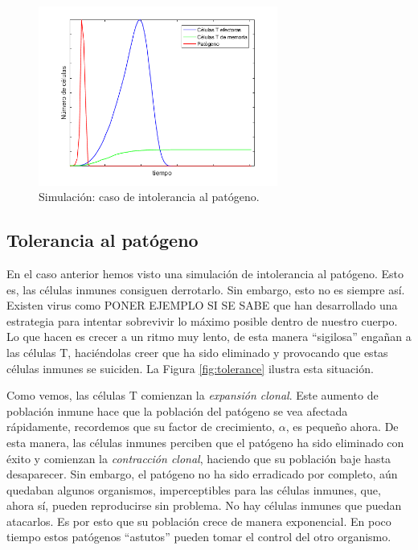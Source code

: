 \begin{figure}[t]
	\centering
	\includegraphics[width=0.7\textwidth]{Imagenes/Simulaciones/intolerance}
	\caption{Simulación: caso de intolerancia al patógeno.}
	\label{fig:intolerance}
\end{figure}

\subsection{Tolerancia al patógeno}

En el caso anterior hemos visto una simulación de intolerancia al patógeno. Esto es, las células inmunes consiguen derrotarlo. Sin embargo, esto no es siempre así. Existen virus como PONER EJEMPLO SI SE SABE que han desarrollado una estrategia para intentar sobrevivir lo máximo posible dentro de nuestro cuerpo. 
Lo que hacen es crecer a un ritmo muy lento, de esta manera ``sigilosa'' engañan a las células T, haciéndolas creer que ha sido eliminado y provocando que estas células inmunes se suiciden. La Figura \ref{fig:tolerance} ilustra esta situación.

Como vemos, las células T comienzan la \textit{expansión clonal}. Este aumento de población inmune hace que la población del patógeno se vea afectada rápidamente, recordemos que su factor de crecimiento, $\alpha$, es pequeño ahora. De esta manera, las células inmunes perciben que el patógeno ha sido eliminado con éxito y comienzan la \textit{contracción clonal}, haciendo que su población baje hasta desaparecer. Sin embargo, el patógeno no ha sido erradicado por completo, aún quedaban algunos organismos, imperceptibles para las células inmunes, que, ahora sí, pueden reproducirse sin problema. No hay células inmunes que puedan atacarlos. Es por esto que su población crece de manera exponencial. En poco tiempo estos patógenos ``astutos'' pueden tomar el control del otro organismo. 

